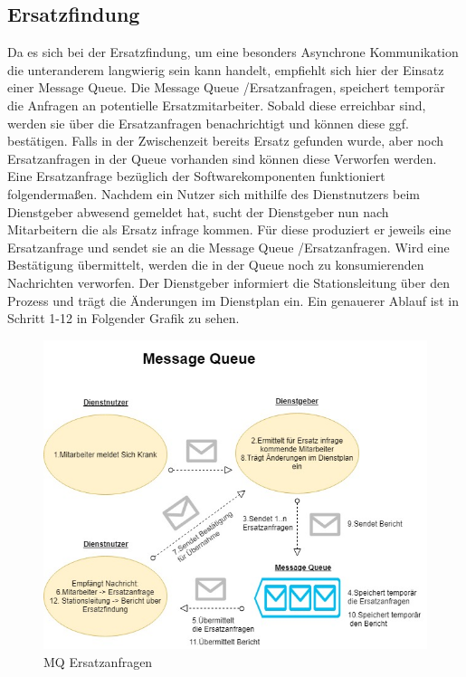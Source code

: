 \documentclass[11pt,
paper=a4,
bibtotocnumbered,	  %
liststotocnumbered,  %
DIV=calc,		  %
tablecaptionabove,	  %
headinclude,
]{article}
\begin{document}
\subsection{Ersatzfindung}
Da es sich bei der Ersatzfindung, um eine besonders Asynchrone Kommunikation die unteranderem langwierig sein kann handelt, empfiehlt sich hier der Einsatz einer Message Queue.
Die Message Queue /Ersatzanfragen, speichert temporär die Anfragen an potentielle Ersatzmitarbeiter. Sobald diese erreichbar sind, werden sie über die Ersatzanfragen benachrichtigt und können diese ggf. bestätigen. Falls in der Zwischenzeit bereits Ersatz gefunden wurde, aber noch Ersatzanfragen in der Queue vorhanden sind können diese Verworfen werden. Eine Ersatzanfrage bezüglich der Softwarekomponenten funktioniert folgendermaßen. Nachdem ein Nutzer sich mithilfe des Dienstnutzers beim Dienstgeber abwesend gemeldet hat, sucht der Dienstgeber nun nach Mitarbeitern die als Ersatz infrage kommen. Für diese produziert er jeweils eine Ersatzanfrage und sendet sie an die Message Queue /Ersatzanfragen. Wird eine Bestätigung übermittelt, werden die in der Queue noch zu konsumierenden Nachrichten verworfen. Der Dienstgeber informiert die Stationsleitung über den Prozess und trägt die Änderungen im Dienstplan ein. Ein genauerer Ablauf ist in Schritt 1-12 in Folgender Grafik zu sehen.
\begin{figure}[H]
\includegraphics[width=1\textwidth]{Bilder/Queue.jpg}
\caption{MQ Ersatzanfragen}
\end{figure}
\end{document}

